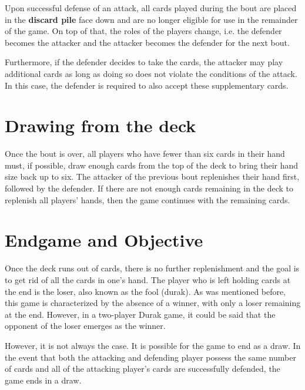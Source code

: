 Upon successful defense of an attack, all cards played during the bout are placed in the \textbf{discard pile} face down and are no longer eligible for use in the remainder of the game. On top of that, the roles of the players change, i.e. the defender becomes the attacker and the attacker becomes the defender for the next bout.

Furthermore, if the defender decides to take the cards, the attacker may play additional cards as long as doing so does not violate the conditions of the attack. In this case, the defender is required to also accept these supplementary cards.

\section{Drawing from the deck}
Once the bout is over, all players who have fewer than six cards in their hand must, if possible, draw enough cards from the top of the deck to bring their hand size back up to six. The attacker of the previous bout replenishes their hand first, followed by the defender. If there are not enough cards remaining in the deck to replenish all players' hands, then the game continues with the remaining cards.

\section{Endgame and Objective}
Once the deck runs out of cards, there is no further replenishment and the goal is to get rid of all the cards in one's hand. The player who is left holding cards at the end is the loser, also known as the fool (durak). As was mentioned before, this game is characterized by the absence of a winner, with only a loser remaining at the end. However, in a two-player Durak game, it could be said that the opponent of the loser emerges as the winner.

However, it is not always the case. It is possible for the game to end as a draw. In the event that both the attacking and defending player possess the same number of cards and all of the attacking player's cards are successfully defended, the game ends in a draw.

